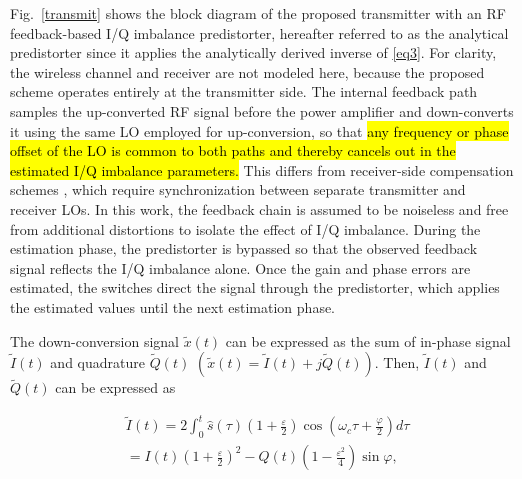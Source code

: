 \documentclass[lettersize,journal]{IEEEtran}
\begin{document}
Fig.~\ref{transmit} shows the block diagram of the proposed transmitter with an RF feedback-based I/Q imbalance predistorter, hereafter referred to as the analytical predistorter since it applies the analytically derived inverse of \eqref{eq3}.
For clarity, the wireless channel and receiver are not modeled here, because the proposed scheme operates entirely at the transmitter side.
The internal feedback path samples the up-converted RF signal before the power amplifier and down-converts it using the same LO employed for up-conversion, so that \hl{any frequency or phase offset of the LO is common to both paths and thereby cancels out in the estimated I/Q imbalance parameters.}
This differs from receiver-side compensation schemes \cite{REF7, REF8, REF9}, which require synchronization between separate transmitter and receiver LOs.
In this work, the feedback chain is assumed to be noiseless and free from additional distortions to isolate the effect of I/Q imbalance.
During the estimation phase, the predistorter is bypassed so that the observed feedback signal reflects the I/Q imbalance alone.
Once the gain and phase errors are estimated, the switches direct the signal through the predistorter, which applies the estimated values until the next estimation phase.

The down-conversion signal $\tilde x(t)$ can be expressed as the sum of in-phase signal $\tilde I(t)$ and quadrature $\tilde Q(t)$ $(\tilde x(t) = \tilde I(t) + j \tilde Q(t))$.
Then, $\tilde I(t)$ and $\tilde Q(t)$ can be expressed as

\begin{equation}
\label{eq4}
\begin{split}
&\tilde I(t) 
= 2 \int_{0}^{t} \hat s(\tau) \left(1+\frac{\varepsilon}{2}\right) \cos \left(\omega_c \tau + \frac{\varphi}{2}\right) d\tau \\
&= I(t) \left(1+\frac{\varepsilon}{2}\right)^2 - Q(t) \left(1-\frac{\varepsilon^2}{4}\right) \sin \varphi,
\end{split}
\end{equation}
\end{document}
